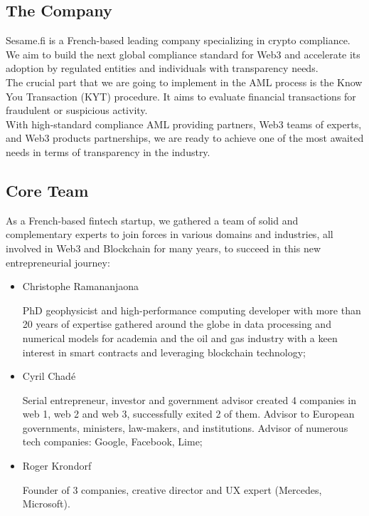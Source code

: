 ﻿\documentclass[a4paper]{article}
\begin{document}
\subsection{The Company}
Sesame.fi is a French-based leading company specializing in crypto compliance. We aim to build the next global compliance standard for Web3 and accelerate its adoption by regulated entities and individuals with transparency needs. \\

The crucial part that we are going to implement in the AML process is the Know You Transaction (KYT) procedure. It aims to evaluate financial transactions for fraudulent or suspicious activity. \\

With high-standard compliance AML providing partners, Web3 teams of experts, and Web3 products partnerships, we are ready to achieve one of the most awaited needs in terms of transparency in the industry.

\subsection{Core Team}
As a French-based fintech startup, we gathered a team of solid and complementary experts to join forces in various domains and industries, all involved in Web3 and Blockchain for many years, to succeed in this new entrepreneurial journey: 

\begin{itemize}
\item Christophe Ramananjaona

PhD geophysicist and high-performance computing developer with more than 20 years of expertise gathered around the globe in data processing and numerical models for academia and the oil and gas industry with a keen interest in smart contracts and leveraging blockchain technology;

\item Cyril Chadé

Serial entrepreneur, investor and government advisor created 4 companies in web 1, web 2 and web 3, successfully exited 2 of them. Advisor to European governments, ministers, law-makers, and institutions. Advisor of numerous tech companies: Google, Facebook, Lime;

\item Roger Krondorf 

Founder of 3 companies, creative director and UX expert (Mercedes, Microsoft).
\end{itemize}
\end{document}
